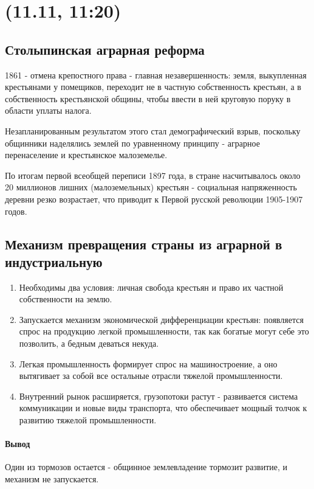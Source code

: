 \section{(11.11, 11:20)}
\subsection{Столыпинская аграрная реформа}
1861 - отмена крепостного права - главная незавершенность: земля, выкупленная крестьянами у помещиков, переходит не в частную собственность крестьян, а в собственность крестьянской общины, чтобы ввести в ней круговую поруку в области уплаты налога.

Незапланированным результатом этого стал демографический взрыв, поскольку общинники наделялись землей по уравненному принципу - аграрное перенаселение и крестьянское малоземелье.

По итогам первой всеобщей переписи 1897 года, в стране насчитывалось около 20 миллионов лишних (малоземельных) крестьян - социальная напряженность деревни резко возрастает, что приводит к Первой русской революции 1905-1907 годов.

\subsection{Механизм превращения страны из аграрной в индустриальную}
\begin{enumerate}
	\item Необходимы два условия: личная свобода крестьян и право их частной собственности на землю.
	\item Запускается механизм экономической дифференциации крестьян: появляется спрос на продукцию легкой промышленности, так как богатые могут себе это позволить, а бедным деваться некуда.
	\item Легкая промышленность формирует спрос на машиностроение, а оно вытягивает за собой все остальные отрасли тяжелой промышленности.
	\item Внутренний рынок расширяется, грузопотоки растут - развивается система коммуникации и новые виды транспорта, что обеспечивает мощный толчок к развитию тяжелой промышленности.
\end{enumerate}

\paragraph{Вывод} Один из тормозов остается - общинное землевладение тормозит развитие, и механизм не запускается.

